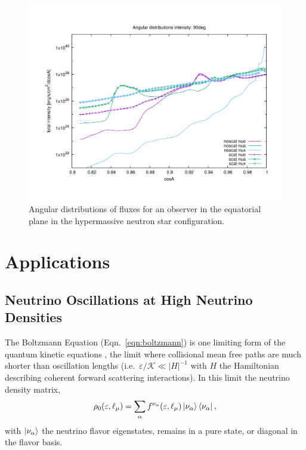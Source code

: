 \documentclass[aps,floatfix,prd,superscriptaddress,twocolumn]{revtex4-1}
\begin{document}
\begin{figure}
  \includegraphics[width=\columnwidth]{cosA_distrib-intensity-250km-90deg}
  \caption{Angular distributions of fluxes for an observer in the equatorial
    plane in the hypermassive neutron star configuration.}
  \label{fig:nsns_cosA_distrib_I_90deg}
\end{figure}

\section{Applications}
\label{sec:applications}

\subsection{Neutrino Oscillations at High Neutrino Densities}
\label{ssec:V_nunu}
The Boltzmann Equation (Eqn.~\ref{eqn:boltzmann}) is one limiting
form of the quantum kinetic equations \cite{vlas2014-neutrino_qkes},
the limit where collisional mean free paths are much shorter
than oscillation lengths (i.e.\ $\varepsilon/\mathscr{K} \ll |H|^{-1}$
with $H$ the Hamiltonian describing coherent forward scattering interactions).
In this limit the neutrino density matrix,
\begin{equation}
  \label{eqn:density_rho_0}
  \rho_0(\varepsilon,\ell_\mu) =
  \sum\limits_{\alpha}f^{\nu_\alpha}(\varepsilon,\ell_\mu)
  \ket{\nu_\alpha} \bra{\nu_\alpha},
\end{equation}
with $\ket{\nu_\alpha}$ the neutrino flavor eigenstates,
remains in a pure state, or diagonal in the flavor basis.
\end{document}
